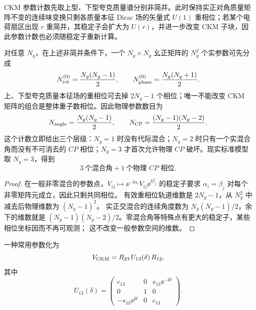 \begin{proposition}[一般世代数的混合参数]
CKM 参数计数先取上型、下型夸克质量谱分别非简并。此时保持实正对角质量矩阵不变的连续味变换只剩各质量本征 Dirac 场的矢量式 $U(1)$ 重相位；若某个电荷扇区出现 $r$ 重简并，其稳定子会扩大为 $U(r)$，并进一步改变 CKM 子块，因此参数计数也必须随稳定子重新计算。

对任意 $N_g$，在上述非简并条件下，一个 $N_g\times N_g$ 幺正矩阵的 $N_g^2$ 个实参数可先分成
\begin{equation}
{
 N_{\rm rot}^{(0)}=\frac{N_g(N_g-1)}2,
 \qquad
 N_{\rm phase}^{(0)}=\frac{N_g(N_g+1)}2.}
\label{eq:unitary-matrix-parameter-split-dp68}
\end{equation}
上、下型夸克质量本征场的重相位可去掉 $2N_g-1$ 个相位；唯一不能改变 CKM 矩阵的组合是整体重子数相位。因此物理参数数目为
\begin{equation}
 {
 N_{\rm angle}=\frac{N_g(N_g-1)}2,
 \qquad
 N_{\rm CP}=\frac{(N_g-1)(N_g-2)}2.}
 \label{eq:ckm-general-parameter-count-dp14}
\end{equation}
这个计数立即给出三个层级：$N_g=1$ 时没有代际混合；$N_g=2$ 时只有一个实混合角而没有不可消去的 $CP$ 相位；$N_g=3$ 才首次允许物理 $CP$ 破坏。现实标准模型取 $N_g=3$，得到
\begin{equation*}
 3\ \text{个混合角}+1\ \text{个物理 $CP$ 相位}.
\end{equation*}
\end{proposition}

\begin{proof}
在一般非零混合的参数点，$V_{ij}\mapsto\ee^{-\ii\alpha_i}V_{ij}\ee^{\ii\beta_j}$
的稳定子要求 $\alpha_i=\beta_j$ 对每个非零矩阵元成立，因此只剩共同相位。
有效重相位轨道维数是 $2N_g-1$，从 $N_g^2$ 中减去后物理维数为 $(N_g-1)^2$。
实正交混合的连续角度数为 $N_g(N_g-1)/2$，余下的维数就是
$(N_g-1)(N_g-2)/2$。零混合角等特殊点有更大的稳定子，某些相位坐标因而不再可观测；
这不改变一般参数空间的维数。
\end{proof}

\begin{definition}[三代标准参数化]
一种常用参数化为
\begin{equation*}
 V_{\rm CKM}=R_{23}\,U_{13}(\delta)\,R_{12},
\end{equation*}
其中
\begin{equation*}
 U_{13}(\delta)=
 \begin{pmatrix}
 c_{13}&0&s_{13}\ee^{-\ii\delta}\\
 0&1&0\\
 -s_{13}\ee^{\ii\delta}&0&c_{13}
 \end{pmatrix}.
\end{equation*}
\end{definition}

